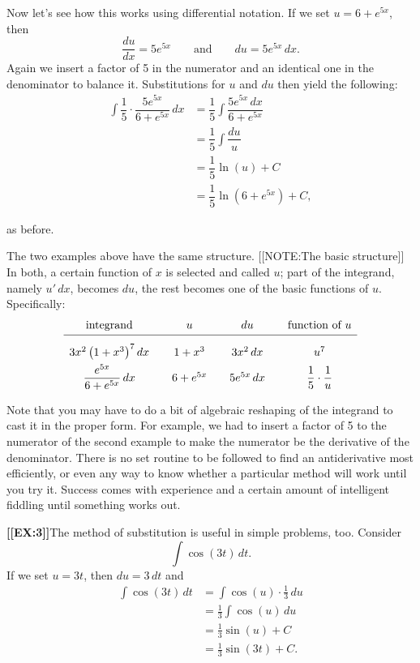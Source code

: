 Now let's see how this works using differential notation.  If we set
$u = 6 + e^{5x}$, then
	\[
\dfrac{du}{dx} = 5e^{5x} \qquad \mbox{and} \qquad
		du = 5e^{5x} \, dx.
\]
Again we insert a factor of 5 in the numerator and an identical one in
the denominator to balance it.  Substitutions for $u$ and $du$ then
yield the following:
\begin{align*}
\int \dfrac{1}{5}\cdot \dfrac{5e^{5x}}{6 + e^{5x}} \, dx 
  &= \dfrac{1}{5} \int \dfrac{5e^{5x} \, dx}{6 + e^{5x}} \\[3pt]
  &= \dfrac{1}{5} \int \dfrac{du}{u} \\[4pt]
  &= \dfrac{1}{5} \ln(u) + C \\[3pt]
  &= \dfrac{1}{5} \ln(6+e^{5x}) + C, 
\end{align*}

as before.




The two examples above have the same structure.  
[[NOTE:The basic structure]]	
In both, a certain function of $x$ is selected and called $u$; part of
the integrand, namely $u'\,dx$, becomes $du$, the rest becomes one of
the basic functions of $u$.  Specifically:
	\[
\begin{array}{ccccccc}
	\mbox{integrand} && u && du 
		&& \mbox{function of $u$} \\[2pt] \hline
	3x^2 \left(1 + x^3\right)^7 dx && 1 + x^3 
		&& 3x^2 \rule{0pt}{18pt}\, dx	&& u^7 \\[4pt]
	\dfrac{e^{5x}}{6 + e^{5x}} \, dx 
		&& 6 + e^{5x} && 5e^{5x} \, dx 
		&& \dfrac{1}{5} \cdot \dfrac{1}{u}
	\end{array}
\]



Note that you may have to do a bit of algebraic reshaping of the
integrand to cast it in the proper form.  For
example, we had to insert a factor of 5 to the numerator of the second
example to make the numerator be the derivative of the denominator.
There is no set routine to be followed to find an antiderivative most
efficiently, or even any way to know whether a particular method will
work until you try it.  Success comes with experience and a certain
amount of intelligent fiddling until something works out.





{\bf [[EX:3]]}\quad The method of substitution is useful in simple
problems, too.  Consider
	\[
\int \cos(3t) \, dt.
\]
If we set $u = 3t$, then $du = 3 \, dt$ and
\begin{align*}
\int \cos(3t) \, dt 
  &= \int \cos(u) \cdot \tfrac{1}{3} \, du \\[2pt]
  &= \tfrac{1}{3} \int \cos(u) \, du \\[4pt]
  &= \tfrac{1}{3} \sin(u) + C \\[6pt]
  &= \tfrac{1}{3} \sin(3t) + C. 
\end{align*}

